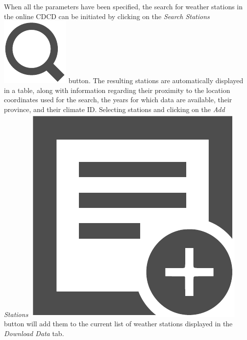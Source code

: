 \documentclass[WHATMANUAL.tex]{subfiles}
\begin{document}
\begin{figure}[!hb]
    \setlength{\fboxsep}{0pt}
    {
    }
    
    \vspace{2em}
    
    {
    }
\end{figure}

When all the parameters have been specified, the search for weather stations in the online CDCD can be initiated by clicking on the \emph{Search Stations}~{\includegraphics[height=2ex]{img/search}} button. The resulting stations are automatically displayed in a table, along with information regarding their proximity to the location coordinates used for the search, the years for which data are available, their province, and their climate ID. Selecting stations and clicking on the \emph{Add Stations}~{\includegraphics[height=2ex]{img/add2list}} button will add them to the current list of weather stations displayed in the \emph{Download Data} tab.
\end{document}
